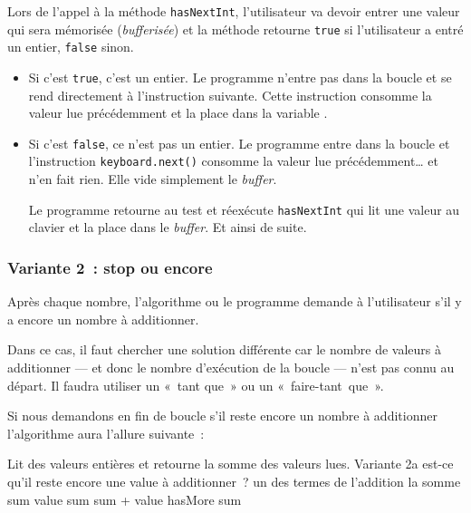 		Lors de l'appel à la méthode \texttt{hasNextInt}, l'utilisateur va
		devoir entrer une valeur qui sera mémorisée (\textit{bufferisée}) et la
		méthode retourne \texttt{true} si l'utilisateur a entré un entier,
		\texttt{false} sinon. 
		\begin{itemize}

			\item Si c'est \texttt{true}, c'est un entier. Le programme n'entre
				pas dans la boucle et se rend directement à l'instruction
				suivante. Cette instruction consomme la valeur lue précédemment
				et la place dans la variable .

			\item Si c'est \texttt{false}, ce n'est pas un entier. Le programme
				entre dans la boucle et l'instruction \texttt{keyboard.next()}
				consomme la valeur lue précédemment… et n'en fait rien. Elle
				vide simplement le \textit{buffer}. 

				Le programme retourne au test et réexécute \texttt{hasNextInt}
				qui lit une valeur au clavier et la place dans le
				\textit{buffer}. Et ainsi de suite. 

		\end{itemize}
			
	\subsubsection{Variante 2~: stop ou encore}
	
		Après chaque nombre, l'algorithme ou le programme demande
		à l’utilisateur s’il y a encore un nombre à additionner.

		Dans ce cas, il faut chercher une solution différente car le nombre de
		valeurs à additionner — et donc le nombre d’exécution de la boucle
		— n'est pas connu au départ. Il faudra utiliser un «~tant que~» ou un
		«~faire-tant~que~». 
		
		Si nous demandons en fin de boucle s’il reste encore
		un nombre à additionner l'algorithme aura l'allure suivante~:

		\begin{pseudocode}
		\LComment Lit des valeurs entières et retourne la somme des valeurs lues.
		 \RComment Variante 2a
			 \RComment est-ce qu’il reste encore 
									une value à additionner~?
			 \RComment un des termes de l’addition
			 \RComment la somme
			\Let sum 
			\Repeat 
				\Read value
				\Let sum \Gets sum + value 
				\Read hasMore
			\Return sum
		\EndAlgo
		\end{pseudocode}

